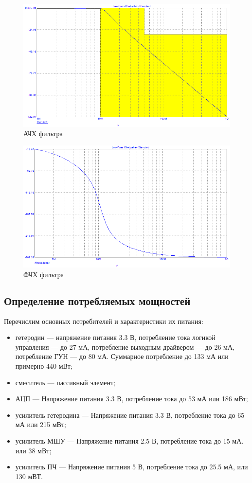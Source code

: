 \documentclass[utf8x, 14pt, oneside, a4paper]{article}
\begin{document}
				\begin{figure}[H]
					\centering
					\includegraphics[width=0.7\linewidth]{"Рисунки/Графики/АЧХ"}
					\caption{АЧХ фильтра}
					\label{fig:graf:filt1}
				\end{figure}
			
				\begin{figure}[H]
					\centering
					\includegraphics[width=0.7\linewidth]{"Рисунки/Графики/ФЧХ"}
					\caption{ФЧХ фильтра}
					\label{fig:graf:filt2}
				\end{figure}
				
		\subsection{Определение потребляемых мощностей}
			Перечислим основных потребителей и характеристики их питания:
			
			\begin{itemize}
				\item гетеродин --- напряжение питания 3.3 В, потребление тока логикой управления --- до 27 мА, потребление выходным драйвером --- до 26 мА, потребление ГУН --- до 80 мА. Суммарное потребление до 133 мА или примерно 440 мВт;
				\item смеситель --- пассивный элемент;
				\item АЦП --- Напряжение питания 3.3 В, потребление тока до 53 мА или 186 мВт;
				\item усилитель гетеродина --- Напряжение питания 3.3 В, потребление тока до 65 мА или 215 мВт;
				\item усилитель МШУ --- Напряжение питания 2.5 В, потребление тока до 15 мА. или 38 мВт;
				\item усилитель ПЧ --- Напряжение питания 5 В, потребление тока до 25.5 мА, или 130 мВТ.
			\end{itemize}
		
\end{document}
